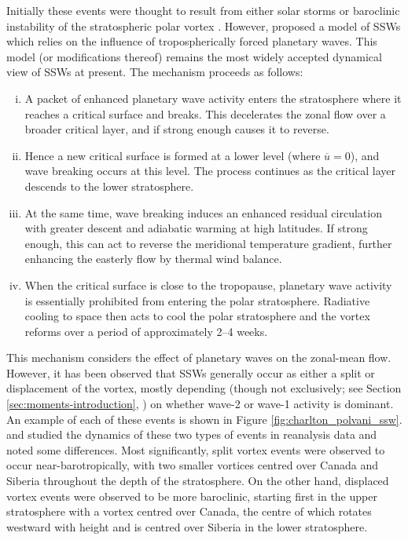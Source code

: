 Initially these events were thought to result from either solar storms
\citep{Scherhag1952} or baroclinic instability of the stratospheric polar vortex
\citep{Murray1960}. However, \citet{Matsuno1970, Matsuno1971} proposed a model
of SSWs which relies on the influence of tropospherically forced planetary
waves. This model (or modifications thereof) remains the most widely accepted
dynamical view of SSWs at present. The mechanism proceeds as follows:
\begin{enumerate}[i.]
\item A packet of enhanced planetary wave activity enters the stratosphere where
  it reaches a critical surface and breaks. This decelerates the zonal flow over
  a broader critical layer, and if strong enough causes it to reverse.
\item Hence a new critical surface is formed at a lower level (where
  $\overline{u}=0$), and wave breaking occurs at this level. The process
  continues as the critical layer descends to the lower stratosphere.
\item At the same time, wave breaking induces an enhanced residual circulation
  with greater descent and adiabatic warming at high latitudes. If strong
  enough, this can act to reverse the meridional temperature gradient, further
  enhancing the easterly flow by thermal wind balance. 
\item When the critical surface is close to the tropopause, planetary wave
  activity is essentially prohibited from entering the polar
  stratosphere. Radiative cooling to space then acts to cool the polar
  stratosphere and the vortex reforms over a period of approximately 2--4 weeks.
\end{enumerate}

This mechanism considers the effect of planetary waves on the zonal-mean
flow. However, it has been observed that SSWs generally occur as either a split
or displacement of the vortex, mostly depending (though not exclusively; see
Section \ref{sec:moments-introduction}, \citep{Waugh1997}) on whether wave-2 or
wave-1 activity is dominant. An example of each of these events is shown in
Figure \ref{fig:charlton_polvani_ssw}. \citet{Charlton2007} and
\citet{Matthewman2009} studied the dynamics of these two types of events in
reanalysis data and noted some differences. Most significantly, split vortex
events were observed to occur near-barotropically, with two smaller vortices
centred over Canada and Siberia throughout the depth of the stratosphere. On the
other hand, displaced vortex events were observed to be more baroclinic,
starting first in the upper stratosphere with a vortex centred over Canada, the
centre of which rotates westward with height and is centred over Siberia in the
lower stratosphere.


